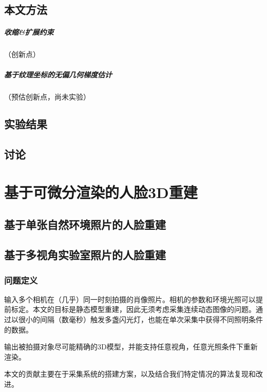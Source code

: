 \documentclass{scutmaster}
\begin{document}
\section{本文方法}

\paragraph{收缩\&扩展约束}（创新点）

\paragraph{基于纹理坐标的无偏几何梯度估计}（预估创新点，尚未实验）

\section{实验结果}

\section{讨论}

\chapter{基于可微分渲染的人脸3D重建}

\section{基于单张自然环境照片的人脸重建}

\section{基于多视角实验室照片的人脸重建}

\subsection{问题定义}

输入多个相机在（几乎）同一时刻拍摄的肖像照片。相机的参数和环境光照可以提前标定。本文的目标是静态模型重建，因此无须考虑采集连续动态图像的问题。通过以很小的间隔（数毫秒）触发多盏闪光灯，也能在单次采集中获得不同照明条件的数据。

输出被拍摄对象尽可能精确的3D模型，并能支持任意视角，任意光照条件下重新渲染。

本文的贡献主要在于采集系统的搭建方案，以及结合我们特定情况的算法复现和改进。
\end{document}
